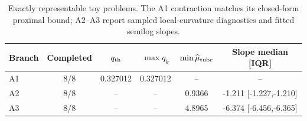 \begin{table}[t]
\centering
\small
\setlength{\tabcolsep}{4pt}
\renewcommand{\arraystretch}{1.12}
\begin{tabular}{@{}lccccc@{}}
\hline
Branch & Completed & $q_{\rm th}$ & $\max q_k$ & $\min\widehat\mu_{\rm tube}$ & Slope median [IQR] \\
\hline
A1 & 8/8 & 0.327012 & 0.327012 & -- & -- \\
A2 & 8/8 & -- & -- & 0.9366 & -1.211 [-1.227,-1.210] \\
A3 & 8/8 & -- & -- & 4.8965 & -6.374 [-6.456,-6.365] \\
\hline
\end{tabular}
\caption{Exactly representable toy problems. The A1 contraction matches its closed-form proximal bound; A2--A3 report sampled local-curvature diagnostics and fitted semilog slopes.}
\label{tab:toy-convergence}
\end{table}
